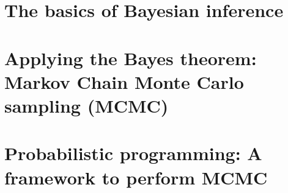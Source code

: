 \section{The basics of Bayesian inference}
\section{Applying the Bayes theorem: Markov Chain Monte Carlo sampling (MCMC)}
\section{Probabilistic programming: A framework to perform MCMC}
